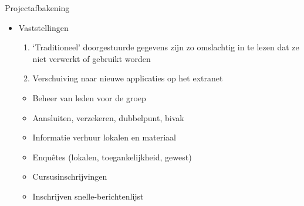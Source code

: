 \documentclass[chiro,pdf]{prosper}
\begin{document}
%
%

{
\begin{slide}{Projectafbakening}

\begin{itemize}
\item Vaststellingen
\begin{itemize}
{
\begin{enumerate}
\item `Traditioneel' doorgestuurde gegevens zijn zo omslachtig in te lezen dat ze niet verwerkt of gebruikt worden
\item Verschuiving naar nieuwe applicaties op het extranet
\end{enumerate}
}
\end{itemize}
{
\begin{itemize}
\item Beheer van leden voor de groep
\item Aansluiten, verzekeren, dubbelpunt, bivak
\end{itemize}
}
{
\begin{itemize}
\item Informatie verhuur lokalen en materiaal
\item Enqu\^etes (lokalen, toegankelijkheid, gewest)
\item Cursusinschrijvingen
\item Inschrijven snelle-berichtenlijst
\end{itemize}
}
\end{itemize}

\end{slide}
}

%
%
\end{document}
